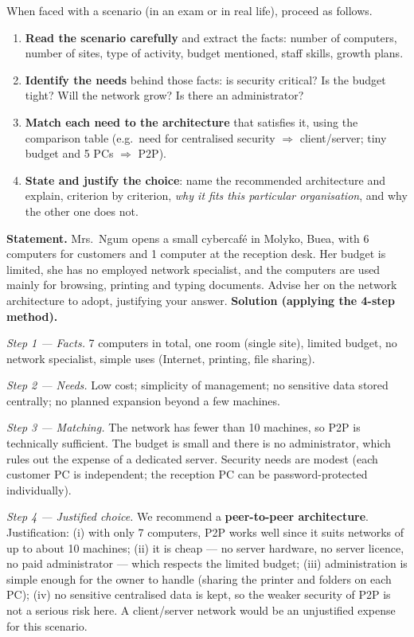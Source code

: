 \documentclass[11pt]{article}
\newcounter{popsec}
\newcounter{popsub}
\newcommand{\courssub}[1]{%
  \stepcounter{popsub}%
  \par\vspace{9pt}\noindent{\popxbold\fontsize{11.5}{13}\selectfont\color{popink}{\color{poporange}\thepopsec.\thepopsub}\hspace{6pt}#1}\par\nopagebreak\vspace{4pt}
}
\begin{document}
\begin{methode}
When faced with a scenario (in an exam or in real life), proceed as follows.
\begin{enumerate}
\item \textbf{Read the scenario carefully} and extract the facts: number of computers, number of sites, type of activity, budget mentioned, staff skills, growth plans.
\item \textbf{Identify the needs} behind those facts: is security critical? Is the budget tight? Will the network grow? Is there an administrator?
\item \textbf{Match each need to the architecture} that satisfies it, using the comparison table (e.g.\ need for centralised security $\Rightarrow$ client/server; tiny budget and 5 PCs $\Rightarrow$ P2P).
\item \textbf{State and justify the choice}: name the recommended architecture and explain, criterion by criterion, \emph{why it fits this particular organisation}, and why the other one does not.
\end{enumerate}
\end{methode}

\courssub{Worked Case Studies}

\begin{exoresolu}
\textbf{Statement.} Mrs.\ Ngum opens a small cybercafé in Molyko, Buea, with 6 computers for customers and 1 computer at the reception desk. Her budget is limited, she has no employed network specialist, and the computers are used mainly for browsing, printing and typing documents. Advise her on the network architecture to adopt, justifying your answer.
\tcblower
\textbf{Solution (applying the 4-step method).}

\emph{Step 1 — Facts.} 7 computers in total, one room (single site), limited budget, no network specialist, simple uses (Internet, printing, file sharing).

\emph{Step 2 — Needs.} Low cost; simplicity of management; no sensitive data stored centrally; no planned expansion beyond a few machines.

\emph{Step 3 — Matching.} The network has fewer than 10 machines, so P2P is technically sufficient. The budget is small and there is no administrator, which rules out the expense of a dedicated server. Security needs are modest (each customer PC is independent; the reception PC can be password-protected individually).

\emph{Step 4 — Justified choice.} We recommend a \textbf{peer-to-peer architecture}. Justification: (i) with only 7 computers, P2P works well since it suits networks of up to about 10 machines; (ii) it is cheap — no server hardware, no server licence, no paid administrator — which respects the limited budget; (iii) administration is simple enough for the owner to handle (sharing the printer and folders on each PC); (iv) no sensitive centralised data is kept, so the weaker security of P2P is not a serious risk here. A client/server network would be an unjustified expense for this scenario.
\end{exoresolu}
\end{document}
